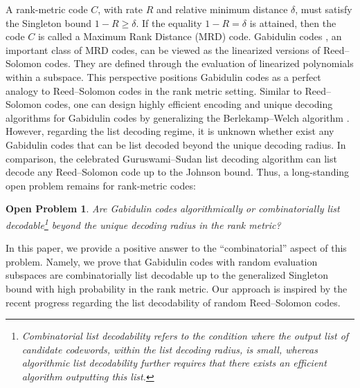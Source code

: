 \documentclass[11pt]{article}
\newif\ifmynotes
\newcommand{\ZGnote}[1]{\ifmynotes\textcolor{purple}{[Zeyu: #1]}\else\fi}
\theoremstyle{plain}
\newtheorem{Op}[thm]{Open Problem}
\theoremstyle{definition}
\theoremstyle{remark}
\begin{document}
A rank-metric code $C$, with rate $R$ and relative minimum distance $\delta$, must satisfy the Singleton bound $1-R \geq \delta$. If the equality $1-R = \delta$ is attained, then the code $C$ is called a Maximum Rank Distance (MRD) code. Gabidulin codes \cite{Del,G85,Rot91}, an important class of MRD codes, can be viewed as the linearized versions of Reed--Solomon codes. They are defined through the evaluation of linearized polynomials within a subspace. This perspective positions Gabidulin codes as a perfect analogy to Reed--Solomon codes in the rank metric setting. Similar to Reed--Solomon codes, one can design highly efficient encoding and unique decoding algorithms for Gabidulin codes by generalizing the Berlekamp--Welch algorithm \cite{kK08}. However, regarding the list decoding regime, it is unknown whether exist any Gabidulin codes that can be list decoded beyond the unique decoding radius. In comparison, the celebrated Guruswami--Sudan list decoding algorithm \cite{GS99} can list decode any Reed--Solomon code up to the Johnson bound. Thus, a long-standing open problem remains for rank-metric codes:
\begin{Op}
Are Gabidulin codes algorithmically or combinatorially list decodable\footnote{Combinatorial list decodability refers to the condition where the output list of candidate codewords, within the list decoding radius, is small, whereas algorithmic list decodability further requires that there exists an efficient algorithm outputting this list.} beyond the unique decoding radius in the rank metric?
\end{Op}
In this paper, we provide a positive answer to the ``combinatorial'' aspect of this problem. %
Namely, we prove that Gabidulin codes with random evaluation subspaces are combinatorially list decodable up to the generalized Singleton bound with high probability in the rank metric. Our approach is inspired by the recent progress regarding the list decodability of random Reed--Solomon codes.
\end{document}
